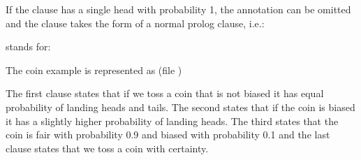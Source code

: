 \documentclass[letterpaper,10pt,english]{sphinxmanual}
\begin{document}
If the clause has a single head with probability 1, the annotation can be omitted and the clause takes
the form of a normal prolog clause, i.e.:

\begin{sphinxVerbatim}[commandchars=\\\{\}]
  
\end{sphinxVerbatim}

stands for:

\begin{sphinxVerbatim}[commandchars=\\\{\}]
  
\end{sphinxVerbatim}

The coin example  is represented as (file )

\begin{sphinxVerbatim}[commandchars=\\\{\}]
   
    \PYGZbs{}

   

  

\end{sphinxVerbatim}

The first clause states that if we toss a coin that is not biased it has equal probability of landing heads and
tails.
The second states that if the coin is biased it has a slightly higher probability of landing heads.
The third states that the coin is fair with probability 0.9 and biased with probability 0.1 and the last clause
states that we toss a coin with certainty.
\end{document}
